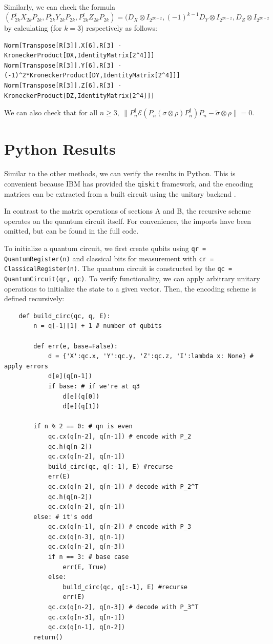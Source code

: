 \documentclass[11pt]{article}
\def\cE{{\mathcal E}}
\begin{document}
\noindent Similarly, we can check the formula
$$(P_{2k}^t X_{2k}P_{2k}, P_{2k}^t Y_{2k}P_{2k}, 
P_{2k}^t Z_{2k}P_{2k}) 
= 
 (D_X \otimes I_{2^{2k-2}}, (-1)^{k-1}D_Y \otimes I_{2^{2k-2}}, 
 D_Z \otimes I_{2^{2k-2}} $$
by calculating (for $k=3$) respectively as follows:
\begin{verbatim}
Norm[Transpose[R[3]].X[6].R[3] - KroneckerProduct[DX,IdentityMatrix[2^4]]]
Norm[Transpose[R[3]].Y[6].R[3] - (-1)^2*KroneckerProduct[DY,IdentityMatrix[2^4]]]
Norm[Transpose[R[3]].Z[6].R[3] - KroneckerProduct[DZ,IdentityMatrix[2^4]]]
\end{verbatim}

\noindent We can also check that for all $n\ge 3,\ \|P_n^\dag \cE( P_n (\sigma \otimes \rho) P_n^\dag) P_n  
-\tilde \sigma \otimes \rho\|=0$.



\section{Python Results}
Similar to the other methods, we can verify the results in Python. 
This is convenient because IBM has provided the \verb|qiskit| framework, and the encoding matrices can be extracted from a built circuit using the unitary backend \cite{qiskit}.

In contrast to the matrix operations of sections A and B, the recursive scheme operates on the quantum circuit itself. For convenience, the imports have been omitted, but can be found in the full code.

To initialize a quantum circuit, we first create qubits using \verb|qr = QuantumRegister(n)| and classical bits for measurement with \verb|cr = ClassicalRegister(n)|. The quantum circuit is constructed by the \verb|qc = QuantumCircuit(qr, qc)|. To verify functionality, we can apply arbitrary unitary operations to initialize the state to a given vector. Then, the encoding scheme is defined recursively:

\begin{verbatim}
    def build_circ(qc, q, E):
        n = q[-1][1] + 1 # number of qubits

        def err(e, base=False):
            d = {'X':qc.x, 'Y':qc.y, 'Z':qc.z, 'I':lambda x: None} # apply errors
            d[e](q[n-1])
            if base: # if we're at q3
                d[e](q[0])
                d[e](q[1])
        
        if n % 2 == 0: # qn is even
            qc.cx(q[n-2], q[n-1]) # encode with P_2
            qc.h(q[n-2])
            qc.cx(q[n-2], q[n-1])
            build_circ(qc, q[:-1], E) #recurse
            err(E)
            qc.cx(q[n-2], q[n-1]) # decode with P_2^T
            qc.h(q[n-2])
            qc.cx(q[n-2], q[n-1])
        else: # it's odd
            qc.cx(q[n-1], q[n-2]) # encode with P_3
            qc.cx(q[n-3], q[n-1])
            qc.cx(q[n-2], q[n-3])
            if n == 3: # base case
                err(E, True)
            else:
                build_circ(qc, q[:-1], E) #recurse
                err(E)
            qc.cx(q[n-2], q[n-3]) # decode with P_3^T
            qc.cx(q[n-3], q[n-1])
            qc.cx(q[n-1], q[n-2])
        return()
\end{verbatim}
\end{document}
